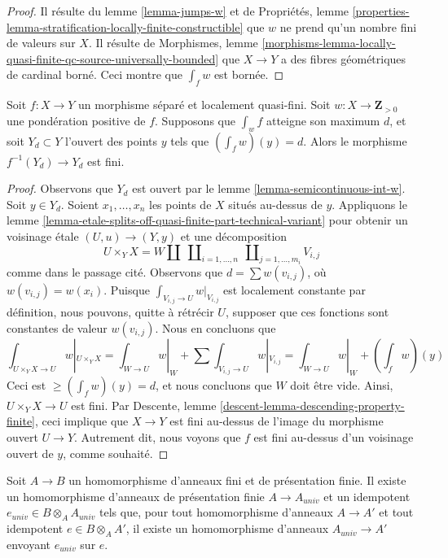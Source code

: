 \begin{proof}
Il résulte du lemme \ref{lemma-jumps-w} et de
Propriétés, lemme
\ref{properties-lemma-stratification-locally-finite-constructible}
que $w$ ne prend qu'un nombre fini de valeurs sur $X$.
Il résulte de Morphismes, lemme
\ref{morphisms-lemma-locally-quasi-finite-qc-source-universally-bounded}
que $X \to Y$ a des fibres géométriques de cardinal borné.
Ceci montre que $\int_f w$ est bornée.
\end{proof}

\begin{lemma}
\label{lemma-max-int-finite}
Soit $f : X \to Y$ un morphisme séparé et localement quasi-fini.
Soit $w : X \to \mathbf{Z}_{> 0}$ une pondération positive de $f$.
Supposons que $\int_w f$ atteigne son maximum $d$, et soit $Y_d \subset Y$
l'ouvert des points $y$ tels que $(\int_f w)(y) = d$. Alors
le morphisme $f^{-1}(Y_d) \to Y_d$ est fini.
\end{lemma}

\begin{proof}
Observons que $Y_d$ est ouvert par le lemme \ref{lemma-semicontinuous-int-w}.
Soit $y \in Y_d$. Soient $x_1, \ldots, x_n$ les points de $X$
situés au-dessus de $y$. Appliquons le
lemme \ref{lemma-etale-splits-off-quasi-finite-part-technical-variant}
pour obtenir un voisinage \'etale $(U, u) \to (Y, y)$ et une décomposition
$$
U \times_Y X =
W \amalg
\ \coprod\nolimits_{i = 1, \ldots, n}
\ \coprod\nolimits_{j = 1, \ldots, m_i}
V_{i, j}
$$
comme dans le passage cité. Observons que $d = \sum w(v_{i, j})$, où
$w(v_{i, j}) = w(x_i)$. Puisque $\int_{V_{i, j} \to U} w|_{V_{i, j}}$
est localement constante par définition, nous pouvons, quitte à rétrécir $U$,
supposer que ces fonctions sont constantes de valeur $w(v_{i, j})$.
Nous en concluons que
$$
\textstyle{\int}_{U \times_Y X \to U} w|_{U \times_Y X} =
\textstyle{\int}_{W \to U} w|_W +
\sum \textstyle{\int}_{V_{i, j} \to U} w|_{V_{i, j}} =
\textstyle{\int}_{W \to U} w|_W + (\int_f w)(y)
$$
Ceci est $\geq (\int_f w)(y) = d$, et nous concluons que $W$
doit être vide. Ainsi, $U \times_Y X \to U$ est fini.
Par Descente, lemme \ref{descent-lemma-descending-property-finite},
ceci implique que $X \to Y$ est fini au-dessus de
l'image du morphisme ouvert $U \to Y$. Autrement dit,
nous voyons que $f$ est fini au-dessus d'un voisinage ouvert de $y$,
comme souhaité.
\end{proof}

\begin{lemma}
\label{lemma-open-and-closed-in-finite}
Soit $A \to B$ un homomorphisme d'anneaux fini et de présentation finie.
Il existe un homomorphisme d'anneaux de présentation finie $A \to A_{univ}$
et un idempotent $e_{univ} \in B \otimes_A A_{univ}$
tels que, pour tout homomorphisme d'anneaux $A \to A'$ et tout idempotent $e \in B \otimes_A A'$,
il existe un homomorphisme d'anneaux $A_{univ} \to A'$ envoyant $e_{univ}$ sur $e$.
\end{lemma}

